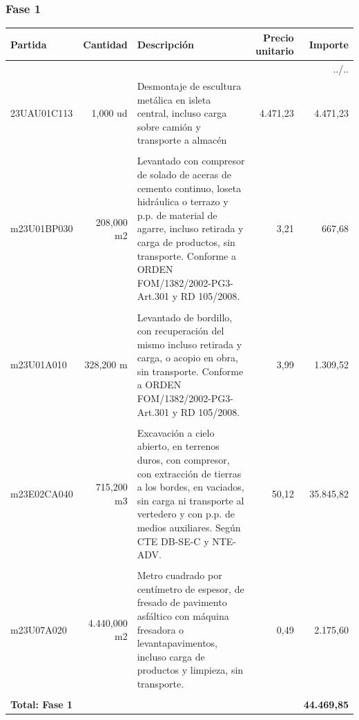 \documentclass{book}%
\begin{document}
\subsubsection{Fase 1}%
\small%
\begin{longtable}{lrlrr}%
Partida&Cantidad&Descripción&\multicolumn{1}{p{1.5cm}}{Precio unitario}&Importe\\%
\hline%
\endhead%
\multicolumn{5}{r}{../..}\\%
\endfoot%
\hline%
\endlastfoot%
23UAU01C113&     1,000 ud&\multicolumn{1}{p{5cm}}{Desmontaje de escultura metálica en isleta central, incluso carga sobre camión y transporte a almacén}&  4.471,23&4.471,23\\%
&&&&\\%
m23U01BP030&   208,000 m2&\multicolumn{1}{p{5cm}}{Levantado con compresor de solado de aceras de cemento continuo, loseta hidráulica o terrazo y p.p. de material de agarre, incluso retirada y carga de productos, sin transporte. Conforme a ORDEN FOM/1382/2002{-}PG3{-}Art.301 y RD 105/2008.}&      3,21&667,68\\%
&&&&\\%
m23U01A010&   328,200 m&\multicolumn{1}{p{5cm}}{Levantado de bordillo, con recuperación del mismo incluso retirada y carga, o acopio en obra, sin transporte. Conforme a ORDEN FOM/1382/2002{-}PG3{-}Art.301 y RD 105/2008.}&      3,99&1.309,52\\%
&&&&\\%
m23E02CA040&   715,200 m3&\multicolumn{1}{p{5cm}}{Excavación a cielo abierto, en terrenos duros, con compresor, con extracción de tierras a los bordes, en vaciados, sin carga ni transporte al vertedero y con p.p. de medios auxiliares. Según CTE DB{-}SE{-}C y NTE{-}ADV.}&     50,12&35.845,82\\%
&&&&\\%
m23U07A020& 4.440,000 m2&\multicolumn{1}{p{5cm}}{Metro cuadrado por centímetro de espesor, de fresado de pavimento asfáltico con máquina fresadora o levantapavimentos, incluso carga de productos y limpieza, sin transporte.}&      0,49&2.175,60\\%
&&&&\\%
\multicolumn{4}{p{8cm}}{\textbf{Total: Fase 1}}&\textbf{44.469,85}\\%
\end{longtable}%
\normalsize

%
\end{document}
